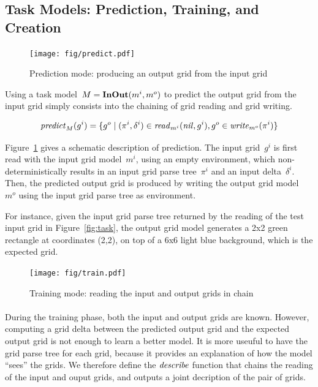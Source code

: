 \documentclass[a4paper]{llncs}
\begin{document}
\subsection{Task Models: Prediction, Training, and Creation}
\label{training:predicting}


\begin{figure}[t]
  \centering
  \texttt{[image: fig/predict.pdf]}
  \caption{Prediction mode: producing an output grid from the input grid}
  \label{fig:predict}
\end{figure}

Using a task model~$M = {\bf InOut}(m^i,m^o)$ to predict the output
grid from the input grid simply consists into the chaining of grid
reading and grid writing.


\[ {\it predict}_M(g^i) = \{g^o \mid (\pi^i,\delta^i) \in {\it read}_{m^i}({\it nil},g^i), g^o \in {\it write}_{m^o}(\pi^i) \} \]

Figure~\ref{fig:predict} gives a schematic description of
prediction. The input grid~$g^i$ is first read with the input grid
model~$m^i$, using an empty environment, which non-deterministically
results in an input grid parse tree~$\pi^i$ and an input
delta~$\delta^i$. Then, the predicted output grid is produced by
writing the output grid model~$m^o$ using the input grid parse tree as
environment.

For instance, given the input grid parse tree returned by the reading
of the test input grid in Figure~\ref{fig:task}, the output grid model
generates a 2x2 green rectangle at coordinates (2,2), on top of a 6x6
light blue background, which is the expected grid.

\begin{figure}[t]
  \centering
  \texttt{[image: fig/train.pdf]}
  \caption{Training mode: reading the input and output grids in chain}
  \label{fig:train}
\end{figure}

\paragraph{}
During the training phase, both the input and output grids are
known. However, computing a grid delta between the predicted output
grid and the expected output grid is not enough to learn a better
model. It is more useuful to have the grid parse tree for each grid,
because it provides an explanation of how the model ``sees'' the
grids. We therefore define the ${\it describe}$ function that chains
the reading of the input and ouput grids, and outputs a joint
decription of the pair of grids.
\end{document}
